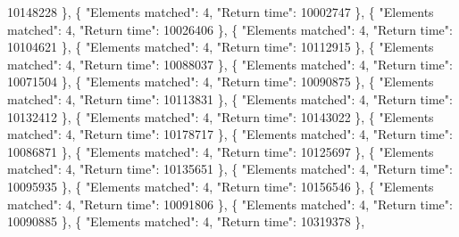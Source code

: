 10148228 \}, \{ "Elements matched": 4, "Return time": 10002747 \}, \{ "Elements matched": 4, "Return time": 10026406 \}, \{ "Elements matched": 4, "Return time": 10104621 \}, \{ "Elements matched": 4, "Return time": 10112915 \}, \{ "Elements matched": 4, "Return time": 10088037 \}, \{ "Elements matched": 4, "Return time": 10071504 \}, \{ "Elements matched": 4, "Return time": 10090875 \}, \{ "Elements matched": 4, "Return time": 10113831 \}, \{ "Elements matched": 4, "Return time": 10132412 \}, \{ "Elements matched": 4, "Return time": 10143022 \}, \{ "Elements matched": 4, "Return time": 10178717 \}, \{ "Elements matched": 4, "Return time": 10086871 \}, \{ "Elements matched": 4, "Return time": 10125697 \}, \{ "Elements matched": 4, "Return time": 10135651 \}, \{ "Elements matched": 4, "Return time": 10095935 \}, \{ "Elements matched": 4, "Return time": 10156546 \}, \{ "Elements matched": 4, "Return time": 10091806 \}, \{ "Elements matched": 4, "Return time": 10090885 \}, \{ "Elements matched": 4, "Return time": 10319378 \},

